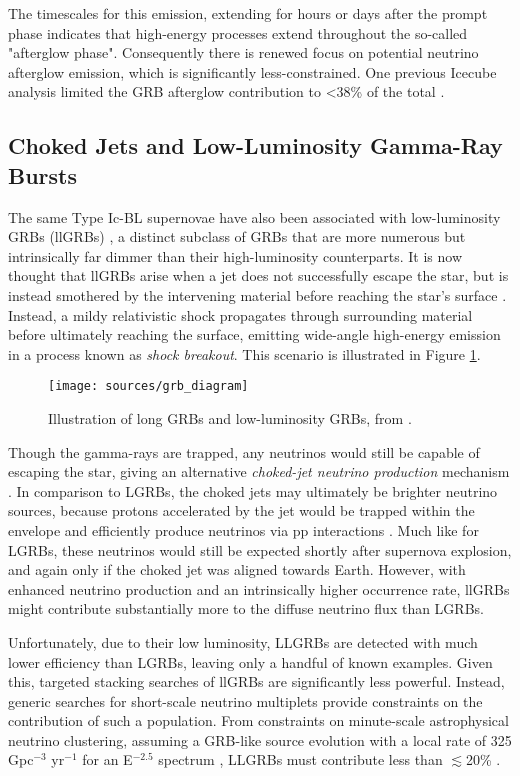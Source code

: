 The timescales for this emission, extending for hours or days after the prompt phase indicates that high-energy processes extend throughout the so-called "afterglow phase". Consequently there is renewed focus on potential neutrino afterglow emission, which is significantly less-constrained. One previous Icecube analysis limited the GRB afterglow contribution to <38\% of the total .

\subsection*{Choked Jets and Low-Luminosity Gamma-Ray Bursts}

The same Type Ic-BL supernovae have also been associated with low-luminosity GRBs (llGRBs)  , a distinct subclass of GRBs that are more numerous but intrinsically far dimmer than their high-luminosity counterparts. It is now thought that llGRBs arise when a jet does not successfully escape the star, but is instead smothered by the intervening material before reaching the star's surface . Instead, a mildy relativistic shock propagates through surrounding material before ultimately reaching the surface, emitting wide-angle high-energy emission in a process known as \emph{shock breakout}. This scenario is illustrated in Figure \ref{fig:grb_diagram}.

\begin{figure}[!ht]
	\centering \texttt{[image: sources/grb\_diagram]}
	\caption{Illustration of long GRBs and low-luminosity GRBs, from \cite{nakar_15_llgrb}.}
	\label{fig:grb_diagram}
\end{figure}

Though the gamma-rays are trapped, any neutrinos would still be capable of escaping the star, giving an alternative \emph{choked-jet neutrino production} mechanism . In comparison to LGRBs, the choked jets may ultimately be brighter neutrino sources, because protons accelerated by the jet would be trapped within the envelope and efficiently produce neutrinos via pp interactions \cite{nakar_15_llgrb}. Much like for LGRBs, these neutrinos would still be expected shortly after supernova explosion, and again only if the choked jet was aligned towards Earth. However, with enhanced neutrino production and an intrinsically higher occurrence rate, llGRBs might contribute substantially more to the diffuse neutrino flux than LGRBs. 

Unfortunately, due to their low luminosity, LLGRBs are detected with much lower efficiency than LGRBs, leaving only a handful of known examples. Given this, targeted stacking searches of llGRBs are significantly less powerful. Instead, generic searches for short-scale neutrino multiplets provide constraints on the contribution of such a population. From constraints on minute-scale astrophysical neutrino clustering, assuming a GRB-like source evolution with a local rate of 325 Gpc$^{-3}$ yr$^{-1}$ for an E$^{-2.5}$ spectrum \cite{07_llgrb}, LLGRBs must contribute less than $\lesssim$20\% .

